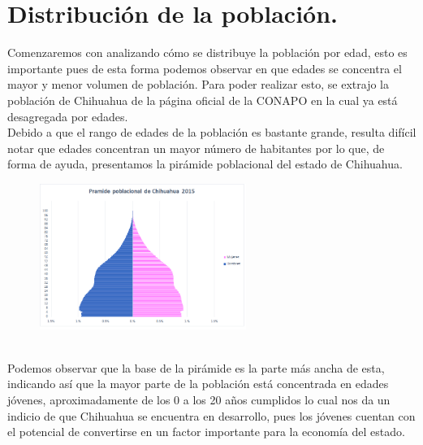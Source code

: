 \documentclass[fontsize=11pt]{article}
\begin{document}
\section*{Distribución de la población.}
	Comenzaremos con analizando cómo se distribuye la población por edad, esto es importante pues de esta forma podemos observar en que edades se concentra el mayor y menor volumen de población. Para poder realizar esto, se extrajo la población de Chihuahua de la página oficial de la CONAPO en la cual ya está desagregada por edades. 
\\Debido a que el rango de edades de la población es bastante grande, resulta difícil notar que edades concentran un mayor número de habitantes por lo que, de forma de ayuda, presentamos la pirámide poblacional del estado de Chihuahua.

\begin{figure}[H]
\centering
\includegraphics[width=0.6\textwidth]{Piramide}
\end{figure}

\\Podemos observar que la base de la pirámide es la parte más ancha de esta, indicando así que la mayor parte de la población está concentrada en edades jóvenes, aproximadamente de los 0 a los 20 años cumplidos lo cual nos da un indicio de que Chihuahua se encuentra en desarrollo, pues los jóvenes cuentan con el potencial de convertirse en un factor importante para la economía del estado.
\end{document}
